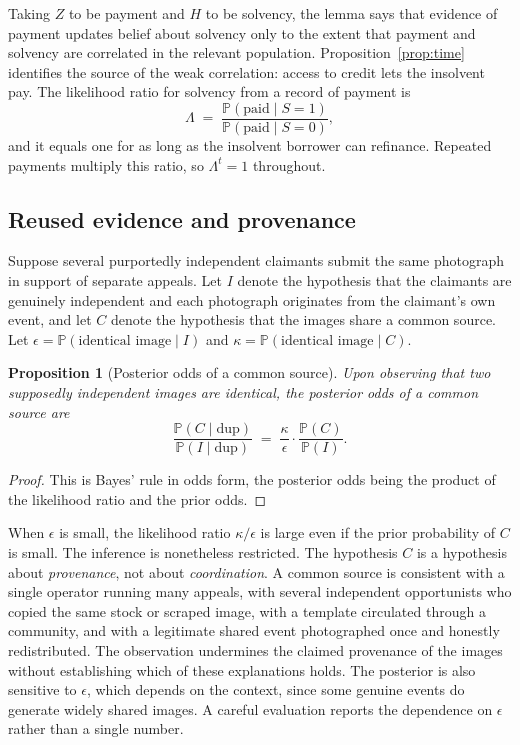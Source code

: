 \documentclass[11pt]{article}
\newtheorem{proposition}[theorem]{Proposition}
\theoremstyle{definition}
\theoremstyle{remark}
\newcommand{\Prob}{\mathbb{P}}
\begin{document}
Taking $Z$ to be payment and $H$ to be solvency, the lemma says that evidence of payment updates belief about solvency only to the extent that payment and solvency are correlated in the relevant population. Proposition~\ref{prop:time} identifies the source of the weak correlation: access to credit lets the insolvent pay. The likelihood ratio for solvency from a record of payment is
\[
\Lambda \;=\; \frac{\Prob(\text{paid}\mid S=1)}{\Prob(\text{paid}\mid S=0)},
\]
and it equals one for as long as the insolvent borrower can refinance. Repeated payments multiply this ratio, so $\Lambda^t=1$ throughout.

\subsection{Reused evidence and provenance}

Suppose several purportedly independent claimants submit the same photograph in support of separate appeals. Let $I$ denote the hypothesis that the claimants are genuinely independent and each photograph originates from the claimant's own event, and let $C$ denote the hypothesis that the images share a common source. Let $\epsilon=\Prob(\text{identical image}\mid I)$ and $\kappa=\Prob(\text{identical image}\mid C)$.

\begin{proposition}[Posterior odds of a common source]\label{prop:dup}
Upon observing that two supposedly independent images are identical, the posterior odds of a common source are
\[
\frac{\Prob(C\mid\text{dup})}{\Prob(I\mid\text{dup})}\;=\;\frac{\kappa}{\epsilon}\cdot\frac{\Prob(C)}{\Prob(I)} .
\]
\end{proposition}

\begin{proof}
This is Bayes' rule in odds form, the posterior odds being the product of the likelihood ratio and the prior odds.
\end{proof}

When $\epsilon$ is small, the likelihood ratio $\kappa/\epsilon$ is large even if the prior probability of $C$ is small. The inference is nonetheless restricted. The hypothesis $C$ is a hypothesis about \emph{provenance}, not about \emph{coordination}. A common source is consistent with a single operator running many appeals, with several independent opportunists who copied the same stock or scraped image, with a template circulated through a community, and with a legitimate shared event photographed once and honestly redistributed. The observation undermines the claimed provenance of the images without establishing which of these explanations holds. The posterior is also sensitive to $\epsilon$, which depends on the context, since some genuine events do generate widely shared images. A careful evaluation reports the dependence on $\epsilon$ rather than a single number.
\end{document}
